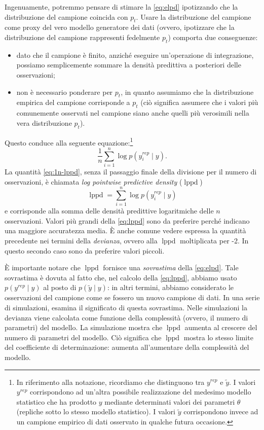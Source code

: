 \documentclass[
  10pt,
  italian,
  a4paper,
  extrafontsizes,onecolumn,openright
  ]{memoir}
\providecommand{\tightlist}{%
  \setlength{\itemsep}{0pt}\setlength{\parskip}{0pt}}
\DeclareMathOperator{\lppd}{lppd} %
\theoremstyle{definition}
\theoremstyle{definition}
\theoremstyle{definition}
\theoremstyle{definition}
\theoremstyle{remark}
\begin{document}
Ingenuamente, potremmo pensare di stimare la \eqref{eq:elpd} ipotizzando che la distribuzione del campione coincida con \(p_t\). Usare la distribuzione del campione come proxy del vero modello generatore dei dati (ovvero, ipotizzare che la distribuzione del campione rappresenti fedelmente \(p_t\)) comporta due conseguenze:

\begin{itemize}
\tightlist
\item
  dato che il campione è finito, anziché eseguire un'operazione di integrazione, possiamo semplicemente sommare la densità predittiva a posteriori delle osservazioni;
\item
  non è necessario ponderare per \(p_t\), in quanto assumiamo che la distribuzione empirica del campione corrisponde a \(p_t\) (ciò significa assumere che i valori più comunemente osservati nel campione siano anche quelli più verosimili nella vera distribuzione \(p_t\)).
\end{itemize}

Questo conduce alla seguente equazione:\footnote{In riferimento alla notazione, ricordiamo che \textcite{gelman2014understanding} distinguono tra \(y^{rep}\) e \(\tilde{y}\). I valori \(y^{rep}\) corrispondono ad un'altra possibile realizzazione del medesimo modello statistico che ha prodotto \(y\) mediante determinati valori dei parametri \(\theta\) (repliche sotto lo stesso modello statistico). I valori \(\tilde{y}\) corrispondono invece ad un campione empirico di dati osservato in qualche futura occasione.}
\begin{equation}
\frac{1}{n} \sum_{i=1}^n \log p(y_i^{rep} \mid y).
\label{eq:1n-lppd}
\end{equation}
La quantità \eqref{eq:1n-lppd}, senza il passaggio finale della divisione per il numero di osservazioni, è chiamata \emph{log pointwise predictive density} (\(\lppd\))
\begin{equation}
\lppd = \sum_{i=1}^n \log p(y_i^{rep} \mid y)
\label{eq:lppd}
\end{equation}
e corrisponde alla somma delle densità predittive logaritmiche delle \(n\) osservazioni. Valori più grandi della \eqref{eq:lppd} sono da preferire perché indicano una maggiore accuratezza media. È anche comune vedere espressa la quantità precedente nei termini della \emph{devianza}, ovvero alla \(\lppd\) moltiplicata per -2. In questo secondo caso sono da preferire valori piccoli.

È importante notare che \(\lppd\) fornisce una \emph{sovrastima} della \eqref{eq:elpd}. Tale sovrastima è dovuta al fatto che, nel calcolo della \eqref{eq:lppd}, abbiamo usato \(p(y^{rep} \mid y)\) al posto di \(p(\tilde{y} \mid y)\): in altri termini, abbiamo considerato le osservazioni del campione come se fossero un nuovo campione di dati. In una serie di simulazioni, \textcite{McElreath_rethinking} esamina il significato di questa sovrastima. Nelle simulazioni la devianza viene calcolata come funzione della complessità (ovvero, il numero di parametri) del modello. La simulazione mostra che \(\lppd\) aumenta al crescere del numero di parametri del modello. Ciò significa che \(\lppd\) mostra lo stesso limite del coefficiente di determinazione: aumenta all'aumentare della complessità del modello.
\end{document}
